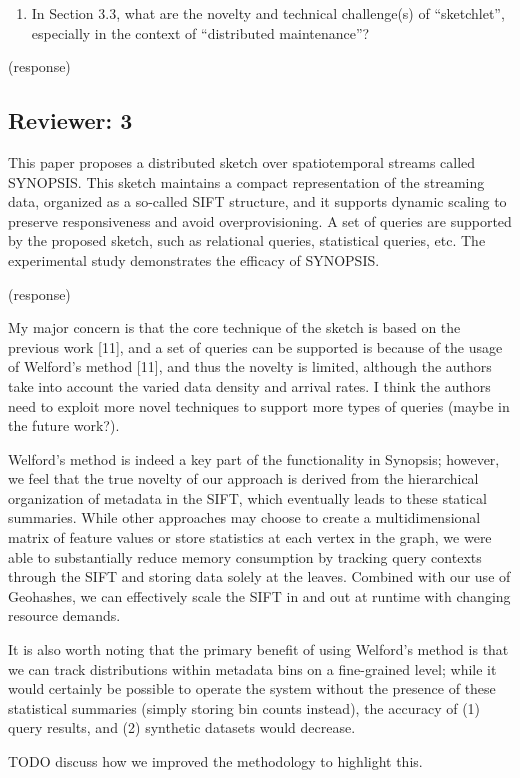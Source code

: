 \documentclass{article}
\begin{document}
\begin{enumerate}
\def\labelenumi{(\arabic{enumi})}
\setcounter{enumi}{2}
\item
  In Section 3.3, what are the novelty and technical challenge(s) of
  ``sketchlet'', especially in the context of ``distributed
  maintenance''?
\end{enumerate}

\begin{tcolorbox}
(response)
\end{tcolorbox}

\subsection*{Reviewer: 3}\label{reviewer-3}

This paper proposes a distributed sketch over spatiotemporal streams
called SYNOPSIS. This sketch maintains a compact representation of the
streaming data, organized as a so-called SIFT structure, and it supports
dynamic scaling to preserve responsiveness and avoid overprovisioning. A
set of queries are supported by the proposed sketch, such as relational
queries, statistical queries, etc. The experimental study demonstrates
the efficacy of SYNOPSIS.

\begin{tcolorbox}
(response)
\end{tcolorbox}

My major concern is that the core technique of the sketch is based on
the previous work {[}11{]}, and a set of queries can be supported is
because of the usage of Welford's method {[}11{]}, and thus the novelty
is limited, although the authors take into account the varied data
density and arrival rates. I think the authors need to exploit more
novel techniques to support more types of queries (maybe in the future
work?).

\begin{tcolorbox}
Welford's method is indeed a key part of the functionality in Synopsis;
however, we feel that the true novelty of our approach is derived from
the hierarchical organization of metadata in the SIFT, which eventually
leads to these statical summaries. While other approaches may choose to
create a multidimensional matrix of feature values or store statistics
at each vertex in the graph, we were able to substantially reduce memory
consumption by tracking query contexts through the SIFT and storing data
solely at the leaves. Combined with our use of Geohashes, we can
effectively scale the SIFT in and out at runtime with changing resource
demands.

It is also worth noting that the primary benefit of using Welford's
method is that we can track distributions within metadata bins on a
fine-grained level; while it would certainly be possible to operate the
system without the presence of these statistical summaries (simply
storing bin counts instead), the accuracy of (1) query results, and (2)
synthetic datasets would decrease.

TODO discuss how we improved the methodology to highlight this.
\end{tcolorbox}
\end{document}
